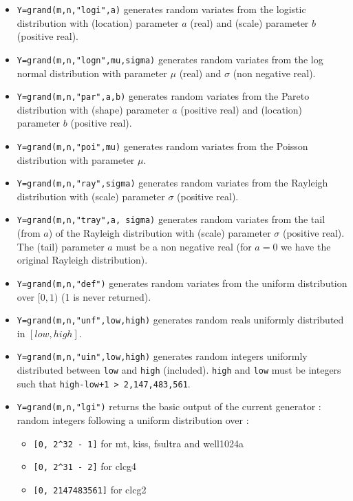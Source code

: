 \begin{description}
\begin{itemize}
\item {} 
  \verb!Y=grand(m,n,"logi",a)! generates random variates from the logistic 
  distribution with (location) parameter $a$ (real) and (scale) parameter $b$ (positive real).
  
\item {} 
  \verb!Y=grand(m,n,"logn",mu,sigma)! generates random variates from the log normal
  distribution with parameter $\mu$ (real) and  $\sigma$ (non negative real).
  
\item {} 
  \verb!Y=grand(m,n,"par",a,b)! generates random variates from the Pareto 
  distribution with (shape) parameter $a$ (positive real) and (location) parameter $b$ (positive real).

\item {} \verb!Y=grand(m,n,"poi",mu)! generates random
  variates from the Poisson distribution with parameter $\mu$. 
  
\item {} 
  \verb!Y=grand(m,n,"ray",sigma)! generates random variates from the Rayleigh 
  distribution with (scale) parameter $\sigma$ (positive real).
  
\item {} 
  \verb!Y=grand(m,n,"tray",a, sigma)! generates random variates from the
  tail (from $a$) of the Rayleigh distribution with (scale) parameter 
  $\sigma$ (positive real). The (tail) parameter $a$ must be a non negative
  real (for $a=0$ we have the original Rayleigh distribution).

\item {} \verb!Y=grand(m,n,"def")! generates random variates from the uniform 
  distribution over $[0,1)$ (1 is never returned).

\item {} \verb!Y=grand(m,n,"unf",low,high)! generates random reals uniformly distributed 
    in $[low, high]$.

\item {} \verb!Y=grand(m,n,"uin",low,high)! generates random integers uniformly 
      distributed between \verb!low! and \verb!high! (included). \verb!high!
      and \verb!low! must be integers such that \verb!high-low+1 > 2,147,483,561!.

\item {} \verb!Y=grand(m,n,"lgi")! returns the basic output of the current generator : random integers  
      following a uniform distribution over : 
      \begin{itemize}
      \item \verb![0, 2^32 - 1]! for mt, kiss, fsultra and well1024a
      \item \verb![0, 2^31 - 2]! for clcg4
      \item \verb![0, 2147483561]! for clcg2
      \end{itemize}


\end{itemize}
\end{description}
